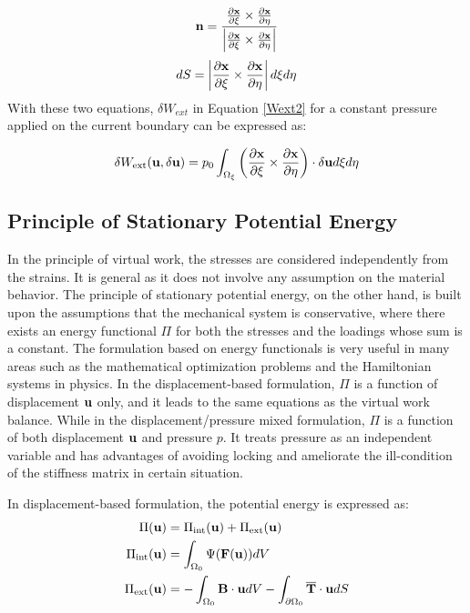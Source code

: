 \begin{equation}
\bold{n} = \frac{  \frac{\partial{\bold{x}}}{\partial{\xi}} \times  \frac{\partial{\bold{x}}}{\partial{\eta}} }{\left| \frac{\partial{\bold{x}}}{\partial{\xi}} \times  \frac{\partial{\bold{x}}}{\partial{\eta}} \right|}
\end{equation}
\begin{equation}
dS = \left|\frac{\partial{\bold{x}}}{\partial{\xi}} \times  \frac{\partial{\bold{x}}}{\partial{\eta}}\right| d\xi{d\eta}
\end{equation}
With these two equations, $\delta W_{ext}$ in Equation \ref{Wext2} for a constant pressure applied on the current boundary can be expressed as:

\begin{equation}
\delta{W_\mathrm{ext}}(\bold{u}, \delta{\bold{u}}) = p_0\int_{\Omega_{\xi}}  \left(\frac{\partial{\bold{x}}}{\partial{\xi}} \times  \frac{\partial{\bold{x}}}{\partial{\eta}}\right) \cdot\delta{\bold{u}}d\xi{d\eta}
\end{equation}

%
\subsection{Principle of Stationary Potential Energy}
In the principle of virtual work, the stresses are considered independently from the strains. It is general as it does not involve any assumption on the material behavior. The principle of stationary potential energy, on the other hand, is built upon the assumptions that the mechanical system is conservative, where there exists an energy functional $\Pi$ for both the stresses and the loadings whose sum is a constant. The formulation based on energy functionals is very useful in many areas such as the mathematical optimization problems and the Hamiltonian systems in physics. In the displacement-based formulation, $\Pi$ is a function of displacement $\bold{u}$ only, and it leads to the same equations as the virtual work balance. While in the displacement/pressure mixed formulation, $\Pi$ is a function of both displacement $\bold{u}$ and pressure $p$. It treats pressure as an independent variable and has advantages of avoiding locking and ameliorate the ill-condition of the stiffness matrix in certain situation.

In displacement-based formulation, the potential energy is expressed as:
\begin{subequations}
\begin{align}
\Pi(\bold{u}) &= \Pi_\mathrm{int}(\bold{u}) + \Pi_\mathrm{ext}(\bold{u}) \\
\Pi_\mathrm{int}(\bold{u}) &= \int_{\Omega_{0}}\Psi(\bold{F}(\bold{u}))dV  \label{pint} \\
\Pi_\mathrm{ext}(\bold{u}) &=  - \int_{\Omega_0}\bold{B}\cdot\bold{u}dV -  \int_{\partial{\Omega_0}}\overline{\bold{T}}\cdot{\bold{u}}dS
\label{pext} 
\end{align}
\end{subequations}

